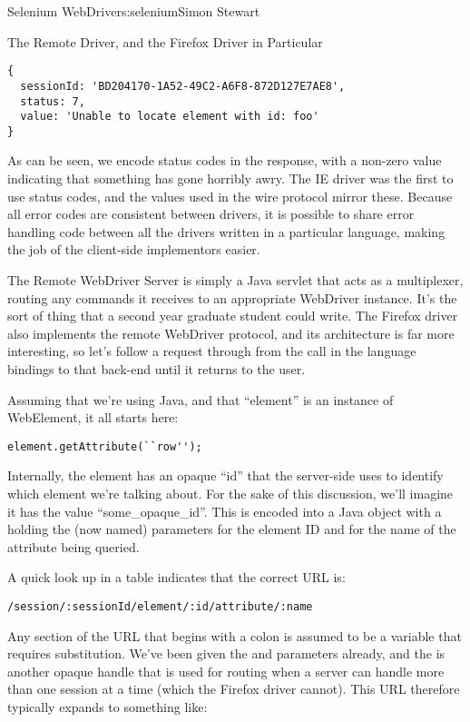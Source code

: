 \begin{aosachapter}{Selenium WebDriver}{s:selenium}{Simon Stewart}
\begin{aosasect1}{The Remote Driver, and the Firefox Driver in Particular}
\begin{verbatim}
{
  sessionId: 'BD204170-1A52-49C2-A6F8-872D127E7AE8',
  status: 7,
  value: 'Unable to locate element with id: foo'
}
\end{verbatim}

\noindent As can be seen, we encode status codes in the response, with a
non-zero value indicating that something has gone horribly awry. The
IE driver was the first to use status codes, and the values used in
the wire protocol mirror these. Because all error codes are consistent
between drivers, it is possible to share error handling code between
all the drivers written in a particular language, making the job of
the client-side implementors easier.

The Remote WebDriver Server is simply a Java servlet that acts as a
multiplexer, routing any commands it receives to an appropriate
WebDriver instance. It's the sort of thing that a second year graduate
student could write. The Firefox driver also implements the remote
WebDriver protocol, and its architecture is far more interesting, so
let's follow a request through from the call in the language bindings
to that back-end until it returns to the user.

\pagebreak

Assuming that we're using Java, and that ``element'' is an instance of
WebElement, it all starts here:

\begin{verbatim}
element.getAttribute(``row'');
\end{verbatim}

\noindent Internally, the element has an opaque ``id'' that the server-side uses
to identify which element we're talking about. For the sake of this
discussion, we'll imagine it has the value ``some\_opaque\_id''. This
is encoded into a Java  object with a  holding
the (now named) parameters  for the element ID
and  for the name of the attribute being queried.

A quick look up in a table indicates that the correct URL is:

\begin{verbatim}
/session/:sessionId/element/:id/attribute/:name
\end{verbatim}

\noindent Any section of the URL that begins with a colon is assumed to be a
variable that requires substitution. We've been given the 
and  parameters already, and the  is
another opaque handle that is used for routing when a server can
handle more than one session at a time (which the Firefox driver
cannot). This URL therefore typically expands to something like:


\end{aosasect1}
\end{aosachapter}
